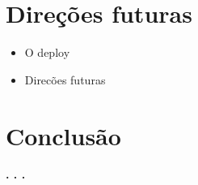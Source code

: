 \documentclass[hyperref={pdfpagelabels=false},11pt]{beamer}
\begin{document}
		\section{Direções futuras}
			\begin{frame}
				\begin{itemize}
					\item{O deploy}
					\item{Direcões futuras}
				\end{itemize}
			\end{frame}
		
		\section{Conclusão}
			\begin{center}
				\textbf{. . .}
			\end{center}
\end{document}
